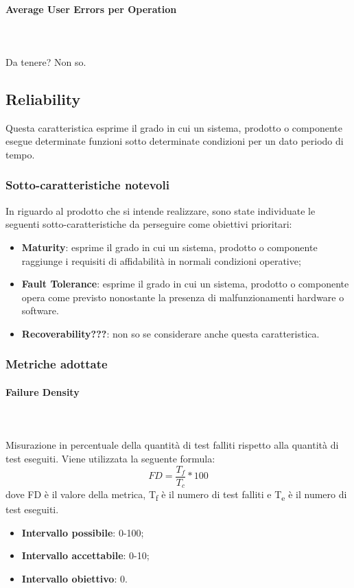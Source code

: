 \paragraph{Average User Errors per Operation}  ~\\ ~\\
Da tenere? Non so.

\subsection{Reliability}
Questa caratteristica esprime il grado in cui un sistema, prodotto o componente esegue determinate funzioni sotto determinate condizioni per un dato periodo di tempo.
\subsubsection{Sotto-caratteristiche notevoli}
In riguardo al prodotto che si intende realizzare, sono state individuate le seguenti sotto-caratteristiche da perseguire come obiettivi prioritari: 
\begin{itemize}
	\item{\textbf{Maturity}}: esprime il grado in cui un sistema, prodotto o componente raggiunge i requisiti di affidabilità in normali condizioni operative;
	\item{\textbf{Fault Tolerance}}: esprime il grado in cui un sistema, prodotto o componente opera come previsto nonostante la presenza di malfunzionamenti hardware o software.
	\item{\textbf{Recoverability???}}: non so se considerare anche questa caratteristica.
\end{itemize}
\subsubsection{Metriche adottate}
\paragraph{Failure Density}  ~\\ ~\\
Misurazione in percentuale della quantità di test falliti rispetto alla quantità di test eseguiti. Viene utilizzata la seguente formula:
$$FD=\frac{T_f}{T_c}*100$$
dove FD è il valore della metrica, T\textsubscript{f} è il numero di test falliti e T\textsubscript{e} è il numero di test eseguiti.
\begin{itemize}
	\item{\textbf{Intervallo possibile}: 0-100;}
	\item{\textbf{Intervallo accettabile}: 0-10;}
	\item{\textbf{Intervallo obiettivo}: 0.}
\end{itemize}

